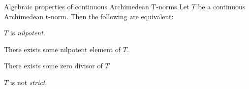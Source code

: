 \begin{theorem}{Algebraic properties of continuous Archimedean T-norms \cite[Thm.~2.18]{Klement2000}}\label{thm:alg_arch_cont}
Let $T$ be a continuous Archimedean t-norm. Then the following are equivalent:
\begin{romanenum}
    \item $T$ is \emph{nilpotent}.
    \item There exists some nilpotent element of $T$.
    \item There exists some zero divisor of $T$.
    \item $T$ is not \emph{strict}.
\end{romanenum}
\end{theorem}



